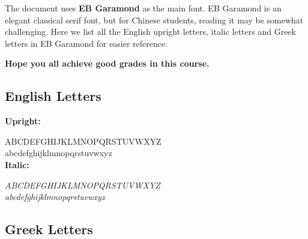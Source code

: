 \documentclass[12pt]{article}
\begin{document}
The document uses \textbf{EB Garamond} as the main font. EB Garamond is an elegant classical serif font, but for Chinese students, reading it may be somewhat challenging.  
Here we list all the English upright letters, italic letters and Greek letters in EB Garamond for easier reference.

\begin{center}
\Large \textcolor{BPink}{\textbf{Hope you all achieve good grades in this course.}}
\end{center}

\subsection*{English Letters}

\noindent\textbf{Upright:}

ABCDEFGHIJKLMNOPQRSTUVWXYZ\\
\indent abcdefghijklmnopqrstuvwxyz\\[0.5em]

\noindent\textbf{Italic:}

\textit{ABCDEFGHIJKLMNOPQRSTUVWXYZ}\\
\indent\textit{abcdefghijklmnopqrstuvwxyz}

\subsection*{Greek Letters}
\end{document}

